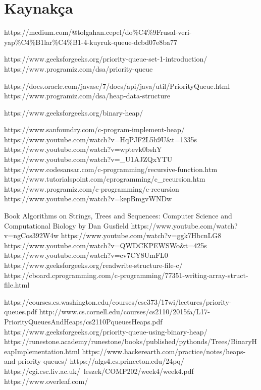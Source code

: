 \documentclass[conference]{IEEEtran}
\begin{document}
\section*{\LARGE Kaynakça}
\begin{thebibliography}{00}
\normalsize
{} https://medium.com/@tolgahan.cepel/do\%C4\%9Frusal-veri-yap\%C4\%B1lar\%C4\%B1-4-kuyruk-queue-dcbd07e8ba77

 https://www.geeksforgeeks.org/priority-queue-set-1-introduction/
 https://www.programiz.com/dsa/priority-queue

 https://docs.oracle.com/javase/7/docs/api/java/util/PriorityQueue.html
 https://www.programiz.com/dsa/heap-data-structure

 https://www.geeksforgeeks.org/binary-heap/


 https://www.sanfoundry.com/c-program-implement-heap/
 https://www.youtube.com/watch?v=HqPJF2L5h9U&t=1335s
 https://www.youtube.com/watch?v=wptevk0bshY
 https://www.youtube.com/watch?v=\_U1AJZQxYTU
 https://www.codesansar.com/c-programming/recursive-function.htm
 https://www.tutorialspoint.com/cprogramming/c\_recursion.htm
 https://www.programiz.com/c-programming/c-recursion
 https://www.youtube.com/watch?v=kepBmgvWNDw

 Book Algorithms on Strings, Trees and Sequences: Computer Science and Computational Biology by Dan Gusfield
 https://www.youtube.com/watch?v=ngCos392W4w
 https://www.youtube.com/watch?v=ggk7HbcnLG8
 https://www.youtube.com/watch?v=QWDCKPEWSWo&t=425s
 https://www.youtube.com/watch?v=cv7CY8UmFL0
 https://www.geeksforgeeks.org/readwrite-structure-file-c/
 https://cboard.cprogramming.com/c-programming/77351-writing-array-struct-file.html

 https://courses.cs.washington.edu/courses/cse373/17wi/lectures/priority-queues.pdf
 http://www.cs.cornell.edu/courses/cs2110/2015fa/L17-PriorityQueuesAndHeaps/cs2110PqueuesHeaps.pdf
 https://www.geeksforgeeks.org/priority-queue-using-binary-heap/
 https://runestone.academy/runestone/books/published/pythonds/Trees/BinaryHeapImplementation.html
 https://www.hackerearth.com/practice/notes/heaps-and-priority-queues/
 https://algs4.cs.princeton.edu/24pq/
 https://cgi.csc.liv.ac.uk/~leszek/COMP202/week4/week4.pdf
 https://www.overleaf.com/

\end{thebibliography}
\end{document}
